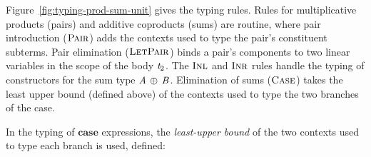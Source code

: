 Figure~\ref{fig:typing-prod-sum-unit} gives the typing rules.  Rules
for multiplicative products (pairs) and additive coproducts (sums) are routine, where
pair introduction ($\textsc{Pair}$)
adds the contexts used to type the pair's constituent subterms. Pair
elimination ($\textsc{LetPair}$) binds a pair's components to two
linear variables in the scope of the body $\mathit{t_{{\mathrm{2}}}}$. The
$\textsc{Inl}$ and $\textsc{Inr}$ rules handle the typing of
constructors for the sum type $\mathit{A}  \, \oplus \,  \mathit{B}$. Elimination of sums
($\textsc{Case}$) takes the least upper bound (defined above) of the contexts used to
type the two branches of the case.

In the typing of $\mathbf{case}$ expressions, the \emph{least-upper
  bound} of the two contexts used to type each branch is used, defined:

